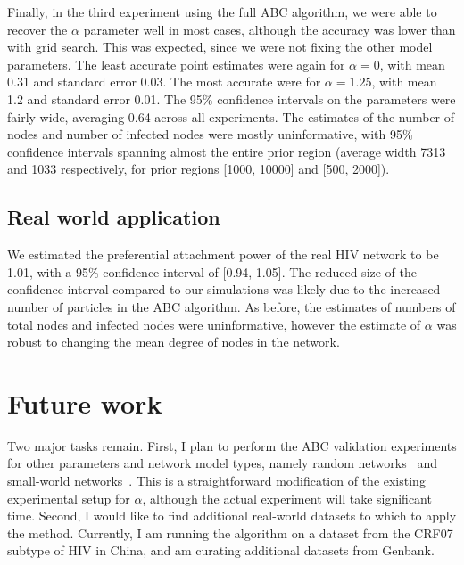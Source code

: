 \documentclass{article}
\begin{document}
Finally, in the third experiment using the full ABC algorithm, we were able to
recover the $\alpha$ parameter well in most cases, although the accuracy was
lower than with grid search. This was expected, since we were not fixing the
other model parameters. The least accurate point estimates were again for
$\alpha = 0$, with mean 0.31 and standard error 0.03. The most accurate were
for $\alpha = 1.25$, with mean 1.2 and standard error 0.01. The 95\% confidence
intervals on the parameters were fairly wide, averaging 0.64 across all
experiments. The estimates of the number of nodes and number of infected nodes
were mostly uninformative, with 95\% confidence intervals spanning almost the
entire prior region (average width 7313 and 1033 respectively, for prior
regions [1000, 10000] and [500, 2000]).

\subsection{Real world application}

We estimated the preferential attachment power of the real HIV network to be
1.01, with a 95\% confidence interval of [0.94, 1.05]. The reduced size of the
confidence interval compared to our simulations was likely due to the increased
number of particles in the ABC algorithm. As before, the estimates of numbers
of total nodes and infected nodes were uninformative, however the estimate of
$\alpha$ was robust to changing the mean degree of nodes in the network.

\section{Future work}

Two major tasks remain. First, I plan to perform the ABC validation experiments
for other parameters and network model types, namely random
networks~\autocite{erdos1960evolution} and small-world
networks~\autocite{watts1998collective}. This is a straightforward modification
of the existing experimental setup for $\alpha$, although the actual experiment
will take significant time. Second, I would like to find additional real-world
datasets to which to apply the method. Currently, I am running the algorithm on
a dataset from the CRF07 subtype of HIV in China, and am curating additional
datasets from Genbank.

\singlespacing
\printbibliography
\end{document}
